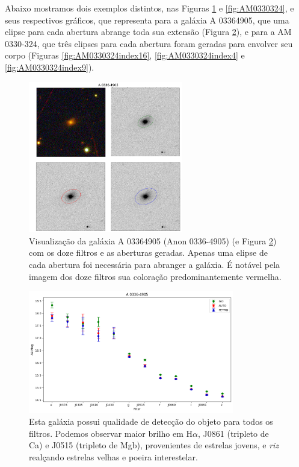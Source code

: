 Abaixo mostramos dois exemplos distintos, nas Figuras \ref{fig:A03364905} e \ref{fig:AM0330324}, e seus respectivos gráficos, que representa para a galáxia A 03364905, que uma elipse para cada abertura abrange toda sua extensão (Figura \ref{fig:A03364905exemplo}), e para a AM 0330-324, que três elipses para cada abertura foram geradas para envolver seu corpo (Figuras \ref{fig:AM0330324index16}, \ref{fig:AM0330324index4} e \ref{fig:AM0330324index9}).

\begin{figure}[!h]
  \centering 
  \includegraphics[width=0.6\textwidth]{Imagens/A03364905.png} 
  \caption[Galáxia A 03364905 (Anon 0336-4905).]{Visualização da galáxia A 03364905 (Anon 0336-4905) (e Figura \ref{fig:A03364905exemplo}) com os doze filtros e as aberturas geradas. Apenas uma elipse de cada abertura foi necessária para abranger a galáxia. É notável pela imagem dos doze filtros sua coloração predominantemente vermelha.}
  \label{fig:A03364905} 
\end{figure}

\begin{figure}[!h]
  \centering 
  \includegraphics[width=0.8\textwidth]{Imagens/A03364905exemplo.png} 
  \caption[Magnitudes da galáxia A 03364905 (Anon 0336-4905).]{Esta galáxia possui qualidade de detecção do objeto para todos os filtros. Podemos observar maior brilho em H$\alpha$, J0861 (tripleto de Ca) e J0515 (tripleto de Mgb), provenientes de estrelas jovens, e \emph{riz} realçando estrelas velhas e poeira interestelar.}
  \label{fig:A03364905exemplo} 
\end{figure}

